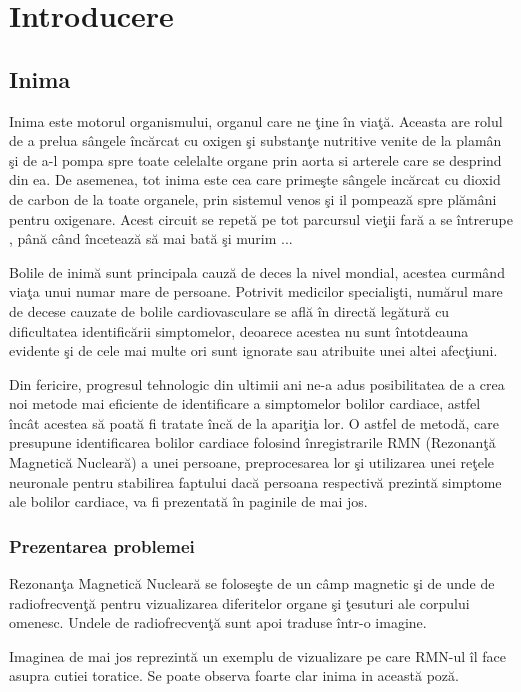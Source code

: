 \chapter{Introducere}

\section{Inima}

Inima este motorul organismului, organul care ne \c{t}ine \^{i}n via\c{t}\u{a}. Aceasta are rolul de a prelua s\^{a}ngele \^{i}nc\u{a}rcat cu oxigen \c{s}i substan\c{t}e nutritive venite de la plam\^{a}n \c{s}i de a-l pompa spre toate celelalte organe prin aorta si arterele care se desprind din ea. De asemenea, tot inima este cea care prime\c{s}te s\^{a}ngele inc\u{a}rcat cu dioxid de carbon de la toate organele, prin sistemul venos \c{s}i il pompeaz\u{a} spre pl\u{a}m\^{a}ni pentru oxigenare. Acest circuit se repet\u{a} pe tot parcursul vie\c{t}ii far\u{a} a se \^{i}ntrerupe , p\^{a}n\u{a} c\^{a}nd \^{i}nceteaz\u{a} s\u{a} mai bat\u{a} \c{s}i murim ...
\par 
Bolile de inim\u{a} sunt principala cauz\u{a} de deces la nivel mondial, acestea curm\^{a}nd via\c{t}a unui numar mare de persoane. Potrivit medicilor speciali\c{s}ti, num\u{a}rul mare de decese cauzate de bolile cardiovasculare se afl\u{a} \^{i}n direct\u{a} leg\u{a}tur\u{a} cu dificultatea identific\u{a}rii simptomelor, deoarece acestea nu sunt \^{i}ntotdeauna evidente \c{s}i de cele mai multe ori sunt ignorate sau atribuite unei altei afec\c{t}iuni.
\par 
Din fericire, progresul tehnologic din ultimii ani ne-a adus posibilitatea de a crea noi metode mai eficiente de identificare a simptomelor bolilor cardiace, astfel \^{i}nc\^{a}t acestea s\u{a} poat\u{a} fi tratate \^{i}nc\u{a} de la apari\c{t}ia lor. O astfel de metod\u{a}, care presupune identificarea bolilor cardiace folosind \^{i}nregistrarile RMN (Rezonan\c{t}\u{a} Magnetic\u{a} Nuclear\u{a}) a unei persoane, preprocesarea lor \c{s}i utilizarea unei re\c{t}ele neuronale pentru stabilirea faptului dac\u{a} persoana respectiv\u{a} prezint\u{a} simptome ale bolilor cardiace, va fi prezentat\u{a} \^{i}n paginile de mai jos. 

\subsection{Prezentarea problemei}

Rezonan\c{t}a Magnetic\u{a} Nuclear\u{a} se folose\c{s}te de un c\^{a}mp magnetic \c{s}i de unde de radiofrecven\c{t}\u{a} pentru vizualizarea diferitelor organe \c{s}i \c{t}esuturi ale corpului omenesc. Undele de radiofrecven\c{t}\u{a} sunt apoi traduse \^{i}ntr-o imagine.
\par
Imaginea de mai jos reprezint\u{a} un exemplu de vizualizare pe care RMN-ul \^{i}l face asupra cutiei toratice. Se poate observa foarte clar inima in aceast\u{a} poz\u{a}.

